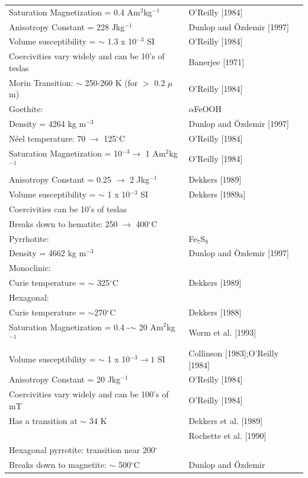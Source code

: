 \begin{center}
\begin{longtable}{ll}
{Saturation Magnetization} = 0.4 Am$^2$kg$^{-1}$&O'Reilly [1984]\\
{Anisotropy Constant }  = 228 {Jkg}$^{-1}$&Dunlop and \"Ozdemir [1997]\\
{Volume susceptibility} = $\sim$ 1.3 x 10$^{-3}$ SI& O'Reilly [1984]\\
 {Coercivities vary widely and can be 10's of teslas}& 
Banerjee [1971]\\
Morin Transition: $\sim$ 250-260 K (for $>$ 0.2 $\mu$m)&O'Reilly [1984]\\
{Goethite:} & $\alpha$FeOOH\\
Density = 4264 kg m$^{-3}$& Dunlop and \"Ozdemir [1997]\\
{N\' eel temperature}: 70 $\rightarrow$ 125$^{\circ}$C & O'Reilly [1984]\\
{Saturation Magnetization} = 10$^{-3}\rightarrow$ 1 Am$^2$kg$^{-1}$ & O'Reilly [1984]\\
{Anisotropy Constant}  = 0.25 $\rightarrow $ 2 {Jkg}$^{-1}$&Dekkers [1989]\\
{Volume susceptibility} = $\sim$ 1 x 10$^{-3}$ SI& Dekkers [1989a]\\
 {Coercivities can be 10's of teslas}\\
Breaks down to hematite: 250 $\rightarrow$ 400$^{\circ}$C\\
\hline
{Pyrrhotite:} &Fe$_7$S$_8$\\
Density = 4662 kg m$^{-3}$& Dunlop and \"Ozdemir [1997]\\
Monoclinic:\\
{Curie temperature } = $\sim$ 325$^{\circ}$C&Dekkers [1989]\\
Hexagonal:\\
{Curie temperature } = $\sim$270$^{\circ}$C&Dekkers [1988]\\
{Saturation Magnetization} = 0.4 -$\sim$ 20 Am$^2$kg$^{-1}$&Worm et al. [1993]\\
{Volume susceptibility} = $\sim$ 1 x 10$^{-3}\rightarrow 1$ SI& Collinson [1983];O'Reilly [1984]\\
{Anisotropy Constant}  = 20 {Jkg}$^{-1}$&O'Reilly [1984]\\
 {Coercivities vary widely and can be 100's of mT}&O'Reilly [1984]\\
Has a transition at $\sim$ 34  K &Dekkers et al. [1989]\\
&Rochette et al. [1990] \\
Hexagonal pyrrotite:  transition near 200$^{\circ}$\\
Breaks down to magnetite: $\sim$ 500$^{\circ}$C&Dunlop and \"Ozdemir

\end{longtable}
\end{center}
